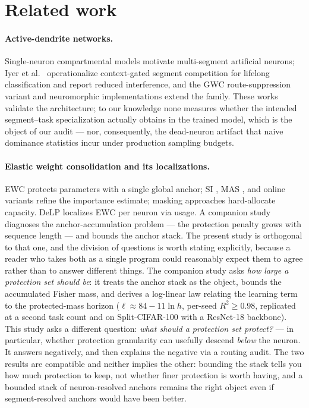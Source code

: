 \documentclass[10pt]{article}
\newcommand{\delp}{DeLP}
\begin{document}
\section{Related work}
\label{sec:related}

\paragraph{Active-dendrite networks.} Single-neuron compartmental models
\citep{poirazi2003,london2005,poirazi2020,ujfalussy2018} motivate
multi-segment artificial neurons; Iyer et al.\ \citep{iyer2022} operationalize
context-gated segment competition for lifelong classification and report
reduced interference, and the GWC route-suppression variant
\citep{boyle2025,baek2024} and neuromorphic implementations
\citep{boahen2022} extend the family. These works validate the architecture;
to our knowledge none measures whether the intended segment--task
specialization actually obtains in the trained model, which is the object
of our audit --- nor, consequently, the dead-neuron artifact that
naive dominance statistics incur under production sampling budgets.

\paragraph{Elastic weight consolidation and its localizations.} EWC
\citep{kirkpatrick2017} protects parameters with a single global anchor;
SI \citep{zenke2017}, MAS \citep{aljundi2018}, and online variants
\citep{chaudhry2018} refine the importance estimate; masking approaches
\citep{mallya2018,serra2018,masse2018} hard-allocate capacity. \delp{}
\citep{zhou2026delp} localizes EWC per neuron via usage. A companion
study \citep{zhou2026anchorbudget} diagnoses the anchor-accumulation
problem --- the protection penalty grows with sequence length --- and
bounds the anchor stack. The present study is orthogonal to that one, and
the division of questions is worth stating explicitly, because a reader
who takes both as a single program could reasonably expect them to agree
rather than to answer different things. The companion study asks
\emph{how large a protection set should be}: it treats the anchor stack
as the object, bounds the accumulated Fisher mass, and derives a
log-linear law relating the learning term to the protected-mass horizon
($\ell \approx 84 - 11\ln h$, per-seed $R^2 \ge 0.98$, replicated at a
second task count and on Split-CIFAR-100 with a ResNet-18 backbone). This
study asks a different question: \emph{what should a protection set
protect?} --- in particular, whether protection granularity can usefully
descend \emph{below} the neuron. It answers negatively, and then explains
the negative via a routing audit. The two results are compatible and
neither implies the other: bounding the stack tells you how much
protection to keep, not whether finer protection is worth having, and a
bounded stack of neuron-resolved anchors remains the right object even if
segment-resolved anchors would have been better.
\end{document}
